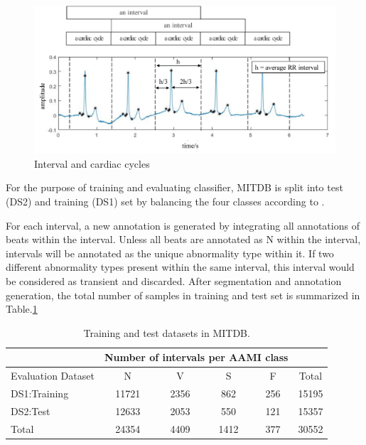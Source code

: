 \begin{figure}[t]
\centering
\includegraphics[scale=.7]{Fig/intervals.pdf}
\caption{Interval and cardiac cycles}
\label{fig:interval}
\end{figure}



For the purpose of training and evaluating classifier, MITDB is split into test (DS2) and training (DS1) set by balancing the four classes according to \cite{autofs}. 

For each interval, a new annotation is generated by integrating all annotations of beats within the interval. Unless all beats are annotated as N within the interval, intervals will be annotated as the unique abnormality type within it. If two different abnormality types present within the same interval, this interval would be considered as transient and discarded. After segmentation and annotation generation, the total number of samples in training and test set is summarized in Table.\ref{table:ds}
\begin{table}[b]
	\centering
	\caption{Training and test datasets in MITDB.}
	\vspace{-0.05in}
	\begin{tabular}{|l||c|c|c|c|c|}
		\hline 
		& \multicolumn{4}{c}{Number of intervals per AAMI class} &\\ 
		\hline 
		Evaluation Dataset& N & V & S & F &Total \\ 
		\hline 
		DS1:Training & 11721& 2356 & 862 & 256 & 15195\\ 
		\hline 
		DS2:Test & 12633 & 2053 & 550 & 121 & 15357 \\ 
		\hline 
		Total & 24354 & 4409 & 1412 & 377 & 30552 \\ 
		\hline 
	\end{tabular}
	\label{table:ds} 
	\vspace{-0.15in}
\end{table}


